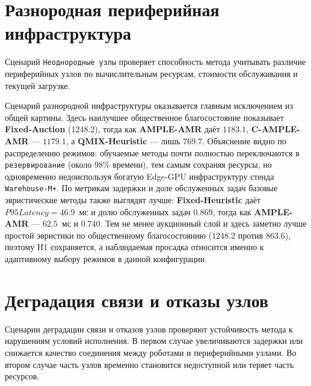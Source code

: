 \section{Разнородная периферийная инфраструктура}

Сценарий \texttt{Неоднородные узлы} проверяет способность метода учитывать различие периферийных узлов по вычислительным ресурсам, стоимости обслуживания и текущей загрузке.



Сценарий разнородной инфраструктуры оказывается главным исключением из общей картины. Здесь наилучшее общественное благосостояние показывает \textbf{Fixed-Auction} ($1248.2$), тогда как \textbf{AMPLE-AMR} даёт $1183.1$, \textbf{C-AMPLE-AMR} --- $1179.1$, а \textbf{QMIX-Heuristic} --- лишь $769.7$. Объяснение видно по распределению режимов: обучаемые методы почти полностью переключаются в \texttt{резервирование} (около $98\%$ времени), тем самым сохраняя ресурсы, но одновременно недоиспользуя богатую Edge-GPU инфраструктуру стенда \texttt{Warehouse-M+}. По метрикам задержки и доле обслуженных задач базовые эвристические методы также выглядят лучше: \textbf{Fixed-Heuristic} даёт $P95Latency=46.9$~мс и долю обслуженных задач $0.869$, тогда как \textbf{AMPLE-AMR} --- $62.5$~мс и $0.740$. Тем не менее аукционный слой и здесь заметно лучше простой эвристики по общественному благосостоянию ($1248.2$ против $863.6$), поэтому H1 сохраняется, а наблюдаемая просадка относится именно к адаптивному выбору режимов в данной конфигурации.

\section{Деградация связи и отказы узлов}

Сценарии деградации связи и отказов узлов проверяют устойчивость метода к нарушениям условий исполнения. В первом случае увеличиваются задержки или снижается качество соединения между роботами и периферийными узлами. Во втором случае часть узлов временно становится недоступной или теряет часть ресурсов.


